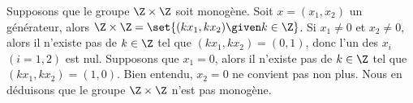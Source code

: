 Supposons que le groupe $\Z \times \Z$ soit monogène. Soit $x = (x_1,x_2)$ un
générateur, alors $\Z \times \Z = \set{(kx_1,kx_2) \given k \in \Z}$.
Si $x_1\neq 0$ et $x_2\neq 0$, alors il n'existe pas de $k\in\Z$ tel que
$(kx_1,kx_2) = (0,1)$, donc l'un des $x_i$ $(i=1,2)$ est nul. Supposons
que $x_1 = 0$, alors il n'existe pas de $k\in\Z$ tel que $(kx_1,kx_2) = (1,0)$.
Bien entendu, $x_2 = 0$ ne convient pas non plus.
Nous en déduisons que le groupe $\Z \times \Z$ n'est pas monogène.
